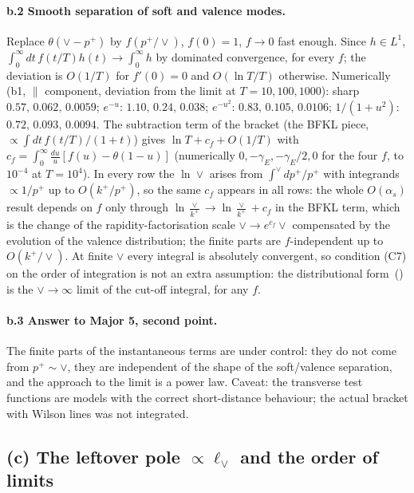 \paragraph{b.2 Smooth separation of soft and valence modes.} Replace $\theta(\vee-p^+)$ by $f(p^+/\vee)$, $f(0)=1$, $f\to0$ fast enough. Since $h\in L^1$, $\int_0^\infty dt\,f(t/T)h(t)\to\int_0^\infty h$ by dominated convergence, for every $f$; the deviation is $O(1/T)$ for $f'(0)=0$ and $O(\ln T/T)$ otherwise. Numerically (b1, $\parallel$ component, deviation from the limit at $T=10,100,1000$): sharp $0.57,\,0.062,\,0.0059$; $e^{-u}$: $1.10,\,0.24,\,0.038$; $e^{-u^2}$: $0.83,\,0.105,\,0.0106$; $1/(1+u^2)$: $0.72,\,0.093,\,0.0094$. The subtraction term of the bracket (the BFKL piece, $\propto\int dt\,f(t/T)/(1+t)$) gives $\ln T+c_f+O(1/T)$ with $c_f=\int_0^\infty\frac{du}{u}[f(u)-\theta(1-u)]$ (numerically $0,-\gamma_E,-\gamma_E/2,0$ for the four $f$, to $10^{-4}$ at $T=10^4$). In every row the $\ln\vee$ arises from $\int^\vee dp^+/p^+$ with integrands $\propto1/p^+$ up to $O(k^+/p^+)$, so the same $c_f$ appears in all rows: the whole $O(\alpha_s)$ result depends on $f$ only through $\ln\frac{\vee}{k^+}\to\ln\frac{\vee}{k^+}+c_f$ in the BFKL term, which is the change of the rapidity-factorisation scale $\vee\to e^{c_f}\vee$ compensated by the evolution of the valence distribution; the finite parts are $f$-independent up to $O(k^+/\vee)$. At finite $\vee$ every integral is absolutely convergent, so condition (C7) on the order of integration is not an extra assumption: the distributional form~() is the $\vee\to\infty$ limit of the cut-off integral, for any $f$.

\paragraph{b.3 Answer to Major 5, second point.} The finite parts of the instantaneous terms are under control: they do not come from $p^+\sim\vee$, they are independent of the shape of the soft/valence separation, and the approach to the limit is a power law. Caveat: the transverse test functions are models with the correct short-distance behaviour; the actual bracket with Wilson lines was not integrated.

\subsection{(c) The leftover pole $\propto\ell_\vee$ and the order of limits}\label{pr:c}

